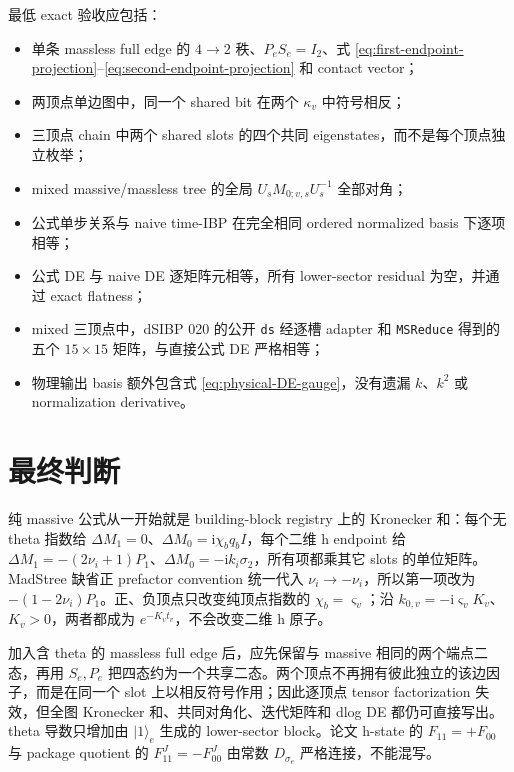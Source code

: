 \documentclass[11pt,a4paper]{ctexart}
\newcommand{\ii}{\mathrm i}
\begin{document}
最低 exact 验收应包括：
\begin{itemize}
  \item 单条 massless full edge 的 $4\to2$ 秩、$P_eS_e=I_2$、式 \eqref{eq:first-endpoint-projection}--\eqref{eq:second-endpoint-projection} 和 contact vector；
  \item 两顶点单边图中，同一个 shared bit 在两个 $\kappa_v$ 中符号相反；
  \item 三顶点 chain 中两个 shared slots 的四个共同 eigenstates，而不是每个顶点独立枚举；
  \item mixed massive/massless tree 的全局 $U_sM_{0;v,s}U_s^{-1}$ 全部对角；
  \item 公式单步关系与 naive time-IBP 在完全相同 ordered normalized basis 下逐项相等；
  \item 公式 DE 与 naive DE 逐矩阵元相等，所有 lower-sector residual 为空，并通过 exact flatness；
  \item mixed 三顶点中，dSIBP 020 的公开 \texttt{ds} 经逐槽 adapter 和 \texttt{MSReduce} 得到的五个 $15\times15$ 矩阵，与直接公式 DE 严格相等；
  \item 物理输出 basis 额外包含式 \eqref{eq:physical-DE-gauge}，没有遗漏 $k$、$k^2$ 或 normalization derivative。
\end{itemize}

\section{最终判断}

纯 massive 公式从一开始就是 building-block registry 上的 Kronecker 和：每个无 theta 指数给 $\Delta M_1=0$、$\Delta M_0=\ii\chi_bq_bI$，每个二维 h endpoint 给 $\Delta M_1=-(2\nu_i+1)P_1$、$\Delta M_0=-\ii k_i\sigma_2$，所有项都乘其它 slots 的单位矩阵。MadStree 缺省正 prefactor convention 统一代入 $\nu_i\to-\nu_i$，所以第一项改为 $-(1-2\nu_i)P_1$。正、负顶点只改变纯顶点指数的 $\chi_b=\varsigma_v$；沿 $k_{0,v}=-\ii\varsigma_vK_v$、$K_v>0$，两者都成为 $e^{-K_vt_v}$，不会改变二维 h 原子。

加入含 theta 的 massless full edge 后，应先保留与 massive 相同的两个端点二态，再用 $S_e,P_e$ 把四态约为一个共享二态。两个顶点不再拥有彼此独立的该边因子，而是在同一个 slot 上以相反符号作用；因此逐顶点 tensor factorization 失效，但全图 Kronecker 和、共同对角化、迭代矩阵和 dlog DE 都仍可直接写出。theta 导数只增加由 $|1\rangle_e$ 生成的 lower-sector block。论文 h-state 的 $F_{11}=+F_{00}$ 与 package quotient 的 $F_{11}^J=-F_{00}^J$ 由常数 $D_{\sigma_e}$ 严格连接，不能混写。
\end{document}
